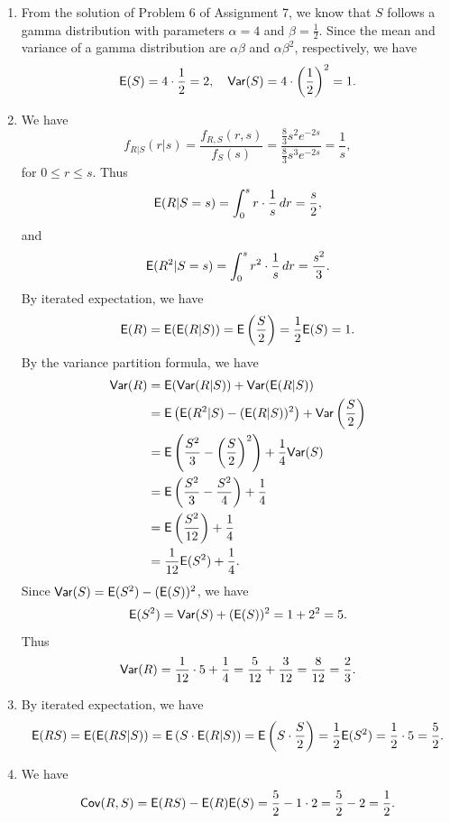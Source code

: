 \documentclass[12pt]{article}
\newcommand{\E}{{\sf E}}
\newcommand{\Var}{{\sf Var}}
\newcommand{\Cov}{{\sf Cov}}
\newenvironment{problem}[2][Problem]{\begin{trivlist}
\item[\hskip \labelsep {\bfseries #1}\hskip \labelsep {\bfseries #2.}]}
{\end{trivlist}}
\begin{document}
\begin{problem}{3}
  \begin{enumerate}
    \item From the solution of Problem 6 of Assignment 7,
    we know that $S$ follows a gamma distribution with parameters
    $\alpha = 4$ and $\beta = \frac{1}{2}$. Since the mean and variance
    of a gamma distribution are
    $\alpha \beta$ and $\alpha \beta^2$, respectively, we have
    \[
      \E(S) = 4 \cdot \frac{1}{2} = 2, \quad \Var(S) = 4 \cdot 
      \left(\frac{1}{2}\right)^2 = 1.
    \]
    \item We have
    \[
      f_{R|S}(r|s) = \frac{f_{R,S}(r,s)}{f_S(s)} 
      = \frac{\frac{8}{3} s^2 e^{-2s}}{\frac{8}{3} s^3 e^{-2s}} = \frac{1}{s},
    \]
    for $0 \le r \le s$. Thus
    \[
      \E(R|S = s) = \int_0^s r \cdot \frac{1}{s} \, dr 
      = \frac{s}{2},
    \]
    and
    \[
      \E(R^2|S = s) = \int_0^s r^2 \cdot \frac{1}{s} \, dr 
      = \frac{s^2}{3}.
    \]
    By iterated expectation, we have
    \[
      \E(R) = \E(\E(R|S)) = \E\left(\frac{S}{2}\right) 
      = \frac{1}{2} \E(S) = 1.
    \]
    By the variance partition formula, we have
    \begin{align*}
      \Var(R) &= \E(\Var(R|S)) + \Var(\E(R|S)) \\
      &= \E\left(\E(R^2|S) - (\E(R|S))^2\right) 
      + \Var\left(\frac{S}{2}\right) \\
      &= \E\left(\frac{S^2}{3} - \left(\frac{S}{2}\right)^2\right) 
      + \frac{1}{4} \Var(S) \\
      &= \E\left(\frac{S^2}{3} - \frac{S^2}{4}\right) + \frac{1}{4} \\
      &= \E\left(\frac{S^2}{12}\right) + \frac{1}{4} \\
      &= \frac{1}{12} \E(S^2) + \frac{1}{4}.
    \end{align*}
    Since $\Var(S) = \E(S^2) - (\E(S))^2$, we have
    \[
      \E(S^2) = \Var(S) + (\E(S))^2 = 1 + 2^2 = 5.
    \]
    Thus
    \[
      \Var(R) = \frac{1}{12} \cdot 5 + \frac{1}{4} = \frac{5}{12} + 
      \frac{3}{12} = \frac{8}{12} = \frac{2}{3}.
    \]
    \item By iterated expectation, we have
    \[
      \E(RS) = \E(\E(RS|S)) = \E\left(S \cdot \E(R|S)\right) 
      = \E\left(S \cdot \frac{S}{2}\right) = \frac{1}{2} \E(S^2) 
      = \frac{1}{2} \cdot 5 = \frac{5}{2}.
    \]
    \item We have
    \[
      \Cov(R, S) = \E(RS) - \E(R)\E(S) = \frac{5}{2} - 1 \cdot 2 = 
      \frac{5}{2} - 2 = \frac{1}{2}.
    \]
  \end{enumerate}
\end{problem}
\end{document}
